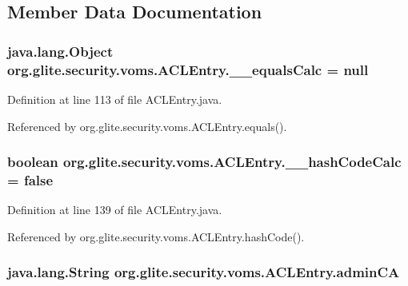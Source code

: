 \subsection{Member Data Documentation}
\hypertarget{classorg_1_1glite_1_1security_1_1voms_1_1ACLEntry_a6afa745bb49f8a8ceb5fb005e27b3fdc}{
\subsubsection[{\_\-\_\-equalsCalc}]{\setlength{\rightskip}{0pt plus 5cm}java.lang.Object {\bf org.glite.security.voms.ACLEntry.\_\-\_\-equalsCalc} = null}}
\label{classorg_1_1glite_1_1security_1_1voms_1_1ACLEntry_a6afa745bb49f8a8ceb5fb005e27b3fdc}


Definition at line 113 of file ACLEntry.java.



Referenced by org.glite.security.voms.ACLEntry.equals().

\hypertarget{classorg_1_1glite_1_1security_1_1voms_1_1ACLEntry_a2503a408cc317ca2fd71c5205efd3872}{
\subsubsection[{\_\-\_\-hashCodeCalc}]{\setlength{\rightskip}{0pt plus 5cm}boolean {\bf org.glite.security.voms.ACLEntry.\_\-\_\-hashCodeCalc} = false}}
\label{classorg_1_1glite_1_1security_1_1voms_1_1ACLEntry_a2503a408cc317ca2fd71c5205efd3872}


Definition at line 139 of file ACLEntry.java.



Referenced by org.glite.security.voms.ACLEntry.hashCode().

\hypertarget{classorg_1_1glite_1_1security_1_1voms_1_1ACLEntry_a0f569a1e865cbaaccd567fc21dc366c0}{
\subsubsection[{adminCA}]{\setlength{\rightskip}{0pt plus 5cm}java.lang.String {\bf org.glite.security.voms.ACLEntry.adminCA}}}
\label{classorg_1_1glite_1_1security_1_1voms_1_1ACLEntry_a0f569a1e865cbaaccd567fc21dc366c0}



